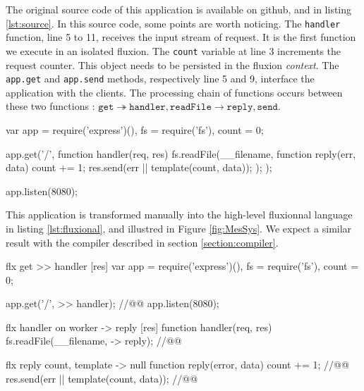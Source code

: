 The original source code of this application is available on github\cite{flx-example}, and in listing \ref{lst:source}.
In this source code, some points are worth noticing.
The \texttt{handler} function, line 5 to 11, receives the input stream of request.
It is the first function we execute in an isolated fluxion.
The \texttt{count} variable at line 3 increments the request counter.
This object needs to be persisted in the fluxion \textit{context}.
The \texttt{app.get} and \texttt{app.send} methods, respectively line 5 and 9, interface the application with the clients.
The processing chain of functions occurs between these two functions : $\texttt{get} \twoheadrightarrow \texttt{handler} , \texttt{readFile} \to \texttt{reply} , \texttt{send}$.

\begin{code}[js,
  caption={Simple web application that replies to every request with its own source code and a counter},
  label={lst:source}]
var app = require('express')(),
    fs = require('fs'),
    count = 0;

app.get('/', function handler(req, res){
  fs.readFile(__filename, function reply(err, data) {
    count += 1;
    res.send(err || template(count, data));
  });
});

app.listen(8080);
\end{code}

This application is transformed manually into the high-level fluxionnal language in listing \ref{lst:fluxional}, and illustred in Figure \ref{fig:MesSys}.
We expect a similar result with the compiler described in section \ref{section:compiler}.


\begin{code}[flx, caption={Manual transformation of the example application in our high-level fluxional language},label={lst:fluxional}]
flx get
>> handler [res]
  var app = require('express')(),
      fs = require('fs'),
      count = 0;

  app.get('/', >> handler); //@\label{lst:fluxional-streamtohandler}@
  app.listen(8080);

flx handler on worker
-> reply [res]
  function handler(req, res) {
    fs.readFile(__filename, -> reply); //@\label{lst:fluxional-readfile}@
  }

flx reply {count, template}
-> null
  function reply(error, data) {
    count += 1; //@\label{lst:fluxional-counter}@
    res.send(err || template(count, data)); //@\label{lst:fluxional-ressend}@
  }
\end{code}

